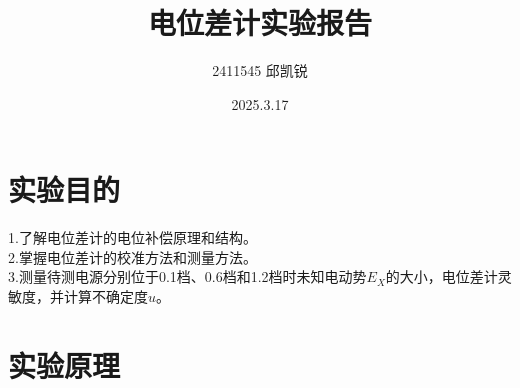 \documentclass{article}
\title{电位差计实验报告}
\author{2411545 邱凯锐}
\date{2025.3.17}
\begin{document}
\maketitle
\section{实验目的}
\hspace*{2em}1.了解电位差计的电位补偿原理和结构。\\
\hspace*{2em}2.掌握电位差计的校准方法和测量方法。\\
\hspace*{2em}3.测量待测电源分别位于0.1档、0.6档和1.2档时未知电动势$E_X$的大小，电位差计灵敏度，并计算不确定度$u$。
\section{实验原理}
\end{document}
